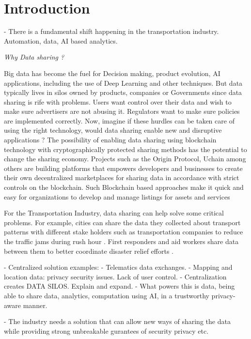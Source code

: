 \section{Introduction}\label{sec:intro}

- There is a fundamental shift happening in the transportation industry. Automation, data, AI based analytics.

{\em Why Data sharing ?}

Big data has become the fuel for Decision making, product evolution, AI applications, including the use of Deep Learning
and other techniques. But data typically lives in silos owned by products, companies or Governments since data sharing
is rife with problems. Users want control over their data and wish to make sure advertisers are not abusing it.
Regulators want to make sure policies are implemented correctly. Now, imagine if these hurdles can be taken care of
using the right technology, would data sharing enable new and disruptive applications ? The possibility of enabling data
sharing using blockchain technology with cryptographically protected sharing methods has the potential to change the
sharing economy.  Projects such as the Origin Protocol, Uchain among others are building platforms that empowers
developers and businesses to create their own decentralized marketplaces for sharing data in accordance with strict
controls on the blockchain. Such Blockchain based approaches make it quick and easy for organizations to develop and
manage listings for assets and services

For the Transportation Industry, data sharing
can help solve some critical problems.  For example, cities can share the data they collected about transport patterns
with different stake holders such as transportation companies to reduce the traffic jams during rush hour
\cite{traffic_jam}. First responders and aid workers share data between them to better coordinate disaster relief
efforts \cite{bharosa_2010}.

- Centralized solution examples:
    - Telematics data exchanges.
    - Mapping and location data: privacy security issues. Lack of user control.
    - Centralization creates DATA SILOS. Explain and expand.
- What powers this is data, being able to share data, analytics, computation using AI, in a trustworthy privacy-aware
manner.

- The industry needs a solution that can allow new ways of sharing the data while providing strong unbreakable gurantees
of security privacy etc.

